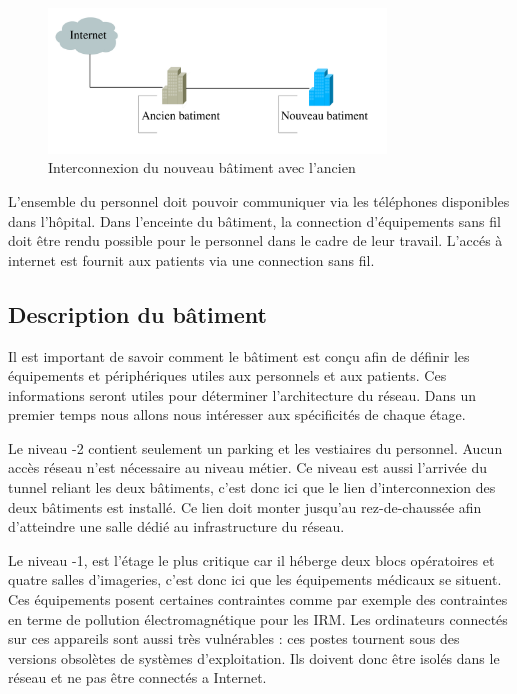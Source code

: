 %
    \cleardoublepage
%

\begin{figure}[!ht]
    \center
    \includegraphics[width=0.8\textwidth]{./images/interco-batiment.png}
    \caption{Interconnexion du nouveau bâtiment avec l'ancien}
\end{figure}

%

L'ensemble du personnel doit pouvoir communiquer via les téléphones disponibles dans l'hôpital.
Dans l'enceinte du bâtiment, la connection d'équipements sans fil doit être rendu possible pour le personnel dans le cadre de leur travail.
L'accés à internet est fournit aux patients via une connection sans fil.


%
    \cleardoublepage
%
%
\subsection{Description du bâtiment}

Il est important de savoir comment le bâtiment est conçu afin de définir les équipements et périphériques utiles aux personnels et aux patients.
Ces informations seront utiles pour déterminer l'architecture du réseau.
Dans un premier temps nous allons nous intéresser aux spécificités de chaque étage.

Le niveau -2 contient seulement un parking et les vestiaires du personnel.
Aucun accès réseau n'est nécessaire au niveau métier.
Ce niveau est aussi l'arrivée du tunnel reliant les deux bâtiments, c'est donc ici que le lien d'interconnexion des deux bâtiments est installé.
Ce lien doit monter jusqu'au rez-de-chaussée afin d'atteindre une salle dédié au infrastructure du réseau.

Le niveau -1, est l'étage le plus critique car il héberge deux blocs opératoires et quatre salles d'imageries, c'est donc ici que les équipements médicaux se situent.
Ces équipements posent certaines contraintes comme par exemple des contraintes en terme de pollution électromagnétique pour les IRM.
Les ordinateurs connectés sur ces appareils sont aussi très vulnérables : ces postes tournent sous des versions obsolètes de systèmes d'exploitation.
Ils doivent donc être isolés dans le réseau et ne pas être connectés a Internet.


